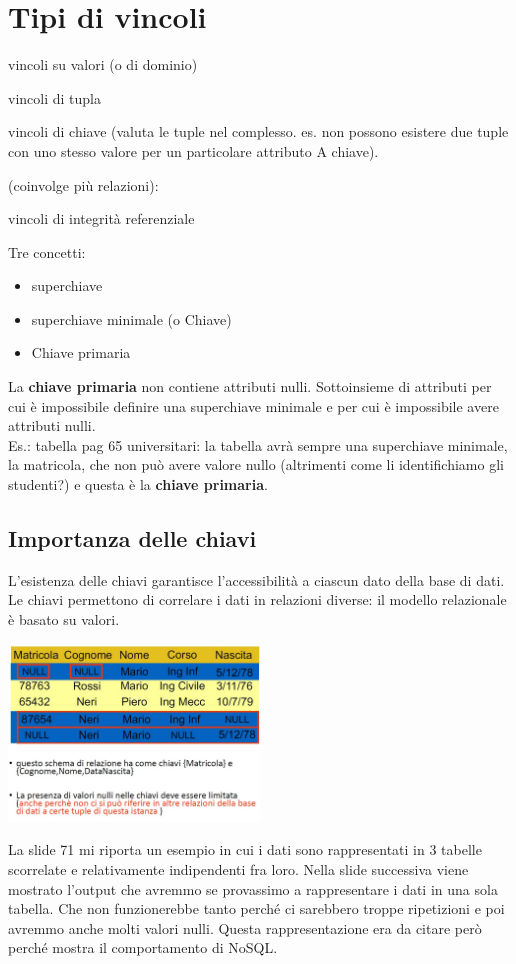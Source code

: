 \section{Tipi di vincoli}
\begin{description}
    \item[vincoli intrarelazionali:]
    \item vincoli su valori (o di dominio)
    \item vincoli di tupla
    \item vincoli di chiave (valuta le tuple nel complesso. es. non possono esistere due tuple con uno stesso valore per un particolare attributo A chiave).
    \item[vincoli interrelazionali] (coinvolge più relazioni): 
    \item vincoli di integrità referenziale
\end{description}
Tre concetti:
\begin{itemize}
    \item superchiave
    \item superchiave minimale (o Chiave)
    \item Chiave primaria
\end{itemize}
La \textbf{chiave primaria} non contiene attributi nulli. Sottoinsieme di attributi per cui è impossibile definire una superchiave minimale e per cui è impossibile avere attributi nulli.
\\Es.: tabella pag 65 universitari: la tabella avrà sempre una superchiave minimale, la matricola, che non può avere valore nullo (altrimenti come li identifichiamo gli studenti?) e questa è la \textbf{chiave primaria}.

\subsection{Importanza delle chiavi}
L'esistenza delle chiavi garantisce l'accessibilità a ciascun dato della base di dati.
\\Le chiavi permettono di correlare i dati in relazioni diverse: il modello relazionale è basato su valori.
\begin{center}
    \includegraphics[width=0.5\textwidth]{img/MR_chiavi777.jpg}
\end{center}
La slide 71 mi riporta un esempio in cui i dati sono rappresentati in 3 tabelle scorrelate e relativamente indipendenti fra loro. Nella slide successiva viene mostrato l'output che avremmo se provassimo a rappresentare i dati in una sola tabella. Che non funzionerebbe tanto perché ci sarebbero troppe ripetizioni e poi avremmo anche molti valori nulli. Questa rappresentazione era da citare però perché mostra il comportamento di NoSQL.

